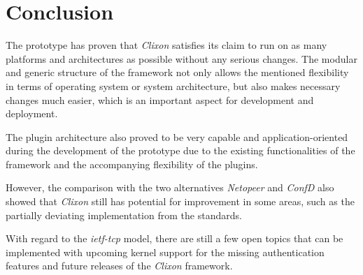 \section{Conclusion} 
\label{sec:conclusion}

The prototype has proven that \textit{Clixon} satisfies its claim to run on as many platforms and architectures as possible without any serious changes.
The modular and generic structure of the framework not only allows the mentioned flexibility in terms of operating system or system architecture, but also makes necessary changes much easier, which is an important aspect for development and deployment.

The plugin architecture also proved to be very capable and application-oriented during the development of the prototype due to the existing functionalities of the framework and the accompanying flexibility of the plugins. 

However, the comparison with the two alternatives \textit{Netopeer} and \textit{ConfD} also showed that \textit{Clixon} still has potential for improvement in some areas, such as the partially deviating implementation from the standards.

With regard to the \textit{ietf-tcp} model, there are still a few open topics that can be implemented with upcoming kernel support for the missing authentication features and future releases of the \textit{Clixon} framework.